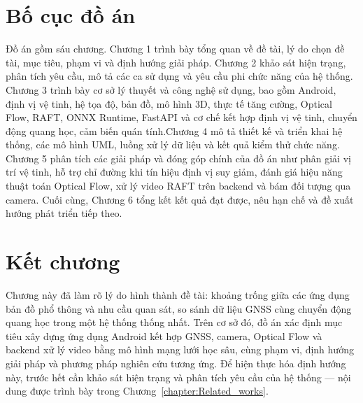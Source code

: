 \documentclass[../DoAn.tex]{subfiles}
\begin{document}
\section{Bố cục đồ án}
\label{section:1.5}
Đồ án gồm sáu chương. Chương 1 trình bày tổng quan về đề tài, lý do chọn đề tài, mục tiêu, phạm vi và định hướng giải pháp. Chương 2 khảo sát hiện trạng, phân tích yêu cầu, mô tả các ca sử dụng và yêu cầu phi chức năng của hệ thống. Chương 3 trình bày cơ sở lý thuyết và công nghệ sử dụng, bao gồm Android, định vị vệ tinh, hệ tọa độ, bản đồ, mô hình 3D, thực tế tăng cường, Optical Flow, RAFT, ONNX Runtime, FastAPI và cơ chế kết hợp định vị vệ tinh, chuyển động quang học, cảm biến quán tính.Chương 4 mô tả thiết kế và triển khai hệ thống, các mô hình UML, luồng xử lý dữ liệu và kết quả kiểm thử chức năng. Chương 5 phân tích các giải pháp và đóng góp chính của đồ án như phân giải vị trí vệ tinh, hỗ trợ chỉ đường khi tín hiệu định vị suy giảm, đánh giá hiệu năng thuật toán Optical Flow, xử lý video RAFT trên backend và bám đối tượng qua camera. Cuối cùng, Chương 6 tổng kết kết quả đạt được, nêu hạn chế và đề xuất hướng phát triển tiếp theo.

\section*{Kết chương}
Chương này đã làm rõ lý do hình thành đề tài: khoảng trống giữa các ứng dụng bản đồ phổ thông và nhu cầu quan sát, so sánh dữ liệu GNSS cùng chuyển động quang học trong một hệ thống thống nhất. Trên cơ sở đó, đồ án xác định mục tiêu xây dựng ứng dụng Android kết hợp GNSS, camera, Optical Flow và backend xử lý video bằng mô hình mạng lưới học sâu, cùng phạm vi, định hướng giải pháp và phương pháp nghiên cứu tương ứng. Để hiện thực hóa định hướng này, trước hết cần khảo sát hiện trạng và phân tích yêu cầu của hệ thống --- nội dung được trình bày trong Chương~\ref{chapter:Related_works}.
\end{document}
